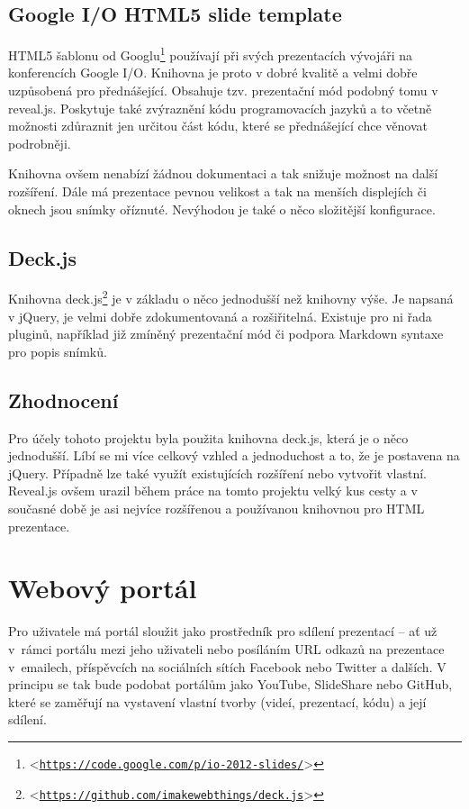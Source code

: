 \documentclass[11pt,twoside,a4paper]{book}
\let\oldUrl\url									%
\renewcommand\url[1]{<\texttt{\oldUrl{#1}}>}
\begin{document}
\subsection{Google I/O HTML5 slide template}
HTML5 šablonu od Googlu\footnote{\url{https://code.google.com/p/io-2012-slides/}} používají při svých prezentacích vývojáři na konferencích Google I/O. Knihovna je proto v dobré kvalitě a velmi dobře uzpůsobená pro přednášející. Obsahuje tzv. prezentační mód podobný tomu v reveal.js. Poskytuje také zvýraznění kódu programovacích jazyků a to včetně možnosti zdůraznit jen určitou část kódu, které se přednášející chce věnovat podrobněji.

Knihovna ovšem nenabízí žádnou dokumentaci a tak snižuje možnost na další rozšíření. Dále má prezentace pevnou velikost a tak na menších displejích či oknech jsou snímky oříznuté. Nevýhodou je také o něco složitější konfigurace.

\subsection{Deck.js}
Knihovna deck.js\footnote{\url{https://github.com/imakewebthings/deck.js}} je v základu o něco jednodušší než knihovny výše. Je napsaná v jQuery, je velmi dobře zdokumentovaná a rozšiřitelná. Existuje pro ni řada pluginů, například již zmíněný prezentační mód či podpora Markdown syntaxe pro popis snímků.

\subsection{Zhodnocení}
Pro účely tohoto projektu byla použita knihovna deck.js, která je o něco jednodušší. Líbí se mi více celkový vzhled a jednoduchost a to, že je postavena na jQuery. Případně lze také využít existujících rozšíření nebo vytvořit vlastní. Reveal.js ovšem urazil během práce na tomto projektu velký kus cesty a v současné době je asi nejvíce rozšířenou a používanou knihovnou pro HTML prezentace.


\section{Webový portál}
Pro uživatele má portál sloužit jako prostředník pro sdílení prezentací – ať už v~rámci portálu mezi jeho uživateli nebo
posíláním URL odkazů na prezentace v~emailech, příspěvcích na sociálních sítích Facebook nebo Twitter a dalších. V principu se tak bude podobat portálům jako YouTube, SlideShare nebo GitHub, které se zaměřují na vystavení vlastní tvorby (videí, prezentací, kódu) a její sdílení.
\end{document}
